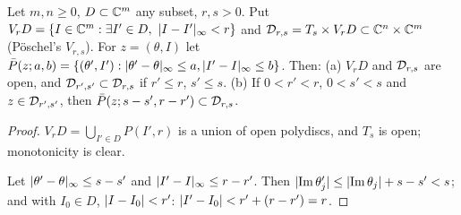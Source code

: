 \begin{definition}[Domains]\label{bpN:p4:domains}
Let $m,n\ge0$, $D\subset\mathbb{C}^m$ any subset, $r,s>0$. Put $V_rD=\{I\in\C^m:\exists I'\in D,\ \abs{I-I'}_\infty<r\}$ and
$\mathcal D_{r,s}=T_s\times V_rD\subset\mathbb{C}^n\times\mathbb{C}^m$ (P\"oschel's $V_{r,s}$). For $z=(\theta,I)$ let $\bar P(z;a,b)=\{(\theta',I'):\lvert \theta'-\theta\rvert_\infty\le a,\lvert I'-I\rvert_\infty\le b\}$.
Then: (a) $V_rD$ and $\mathcal D_{r,s}$ are open, and $\mathcal D_{r',s'}\subset\mathcal D_{r,s}$ if $r'\le r$, $s'\le s$. (b) If $0<r'<r$, $0<s'<s$ and $z\in\mathcal D_{r',s'}$, then $\bar P(z;s-s',r-r')\subset\mathcal D_{r,s}$.
\end{definition}
\begin{proof}
\label{stepN:p4:dom-open} $V_rD=\bigcup_{I'\in D}P(I',r)$ is a union of open polydiscs, and $T_s$ is open; monotonicity is clear.

\label{stepN:p4:dom-poly} Let $\lvert \theta'-\theta\rvert_\infty\le s-s'$ and $\lvert I'-I\rvert_\infty\le r-r'$. Then $\lvert \operatorname{Im}\theta'_j\rvert\le\lvert \operatorname{Im}\theta_j\rvert+s-s'<s$; and
with $I_0\in D$, $\lvert I-I_0\rvert<r'$: $\lvert I'-I_0\rvert<r'+(r-r')=r$.
\end{proof}

